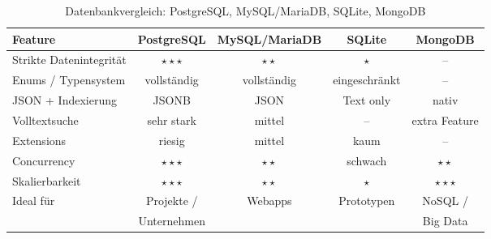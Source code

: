 \setcounter{table}{2} %

\begin{table}[H]
\centering
\caption{Datenbankvergleich: PostgreSQL, MySQL/MariaDB, SQLite, MongoDB}
\label{tab:datenbankvergleich}
\renewcommand{\arraystretch}{1.4}
\begin{tabular}{|l|c|c|c|c|}
\hline
\textbf{Feature} & \textbf{PostgreSQL} & \textbf{MySQL/MariaDB} & \textbf{SQLite} & \textbf{MongoDB} \\
\hline
Strikte Datenintegrität     & $\star\star\star$ & $\star\star$ & $\star$           & --                \\
\hline
Enums / Typensystem         & vollständig       & vollständig  & eingeschränkt     & --                \\
\hline
JSON + Indexierung          & JSONB             & JSON         & Text only         & nativ             \\
\hline
Volltextsuche               & sehr stark        & mittel       & --                & extra Feature     \\
\hline
Extensions                  & riesig            & mittel       & kaum              & --                \\
\hline
Concurrency                 & $\star\star\star$ & $\star\star$ & schwach           & $\star\star$      \\
\hline
Skalierbarkeit              & $\star\star\star$ & $\star\star$ & $\star$           & $\star\star\star$ \\
\hline
Ideal für                   & Projekte /        & Webapps      & Prototypen        & NoSQL /           \\
                            & Unternehmen       &              &                   & Big Data          \\
\hline
\end{tabular}
\end{table}

